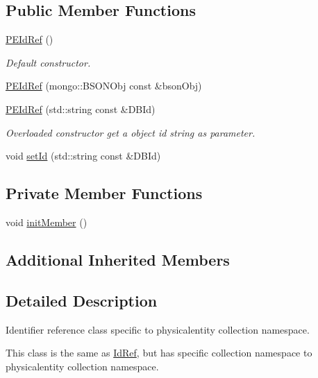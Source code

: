 \subsection*{Public Member Functions}
\begin{DoxyCompactItemize}
\item 
\hyperlink{classunisys_1_1PEIdRef_a5f5a247af4dd093a484ef22e8684996c}{P\-E\-Id\-Ref} ()
\begin{DoxyCompactList}\small\item\em Default constructor. \end{DoxyCompactList}\item 
\hyperlink{classunisys_1_1PEIdRef_acf4f6baa403bc2ad96c3cacb7063e890}{P\-E\-Id\-Ref} (mongo\-::\-B\-S\-O\-N\-Obj const \&bson\-Obj)
\item 
\hyperlink{classunisys_1_1PEIdRef_a3376b93f4afad2e269c4c807a09a2904}{P\-E\-Id\-Ref} (std\-::string const \&D\-B\-Id)
\begin{DoxyCompactList}\small\item\em Overloaded constructor get a object id string as parameter. \end{DoxyCompactList}\item 
void \hyperlink{classunisys_1_1PEIdRef_ada465871b694d0e736ec42a6c6b17bd4}{set\-Id} (std\-::string const \&D\-B\-Id)
\end{DoxyCompactItemize}
\subsection*{Private Member Functions}
\begin{DoxyCompactItemize}
\item 
void \hyperlink{classunisys_1_1PEIdRef_a64b686b3884ed9628e525e43f255d344}{init\-Member} ()
\end{DoxyCompactItemize}
\subsection*{Additional Inherited Members}


\subsection{Detailed Description}
Identifier reference class specific to physicalentity collection namespace. 

This class is the same as \hyperlink{classunisys_1_1IdRef}{Id\-Ref}, but has specific collection namespace to physicalentity collection namespace. 


